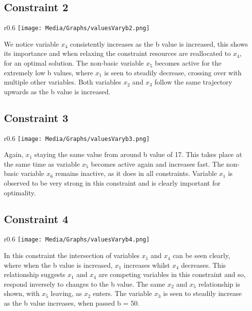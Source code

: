 \documentclass{article}
\numberwithin{equation}{section}
\begin{document}
\subsection{Constraint 2}
\begin{wrapfigure}{r}{0.6\textwidth}
    \centering
    \texttt{[image: Media/Graphs/valuesVaryb2.png]}
\end{wrapfigure}
We notice variable $x_4$ consistently increases as the b value is increased, this shows its importance and when relaxing the constraint resources are reallocated to $x_4$, for an optimal solution. The non-basic variable $x_5$ becomes active for the extremely low b values, where $x_1$ is seen to steadily decrease, crossing over with multiple other variables.  Both variables $x_2$ and $x_3$ follow the same trajectory upwards as the b value is increased. 
\subsection{Constraint 3}
\begin{wrapfigure}{r}{0.6\textwidth}
    \centering
    \texttt{[image: Media/Graphs/valuesVaryb3.png]}
\end{wrapfigure}
Again, $x_1$ staying the same value from around b value of 17. This takes place at the same time as variable $x_5$ becomes active again and increases fast. The non-basic variable $x_6$ remains inactive, as it does in all constraints. Variable $x_1$ is observed to be very strong in this constraint and is clearly important for optimality. 
\subsection{Constraint 4}
\begin{wrapfigure}{r}{0.6\textwidth}
    \centering
    \texttt{[image: Media/Graphs/valuesVaryb4.png]}
\end{wrapfigure}
In this constraint the intersection of variables $x_1$ and $x_4$ can be seen clearly, where when the b value is increased, $x_1$ increases whilst $x_4$ decreases. This relationship suggests $x_1$ and $x_4$ are competing variables in this constraint and so, respond inversely to changes to the b value. The same $x_2$ and $x_5$ relationship is shown, with $x_5$ leaving, as $x_2$ enters. The variable $x_3$ is seen to steadily increase as the b value increases, when passed b = 50. 
\newpage
\end{document}
